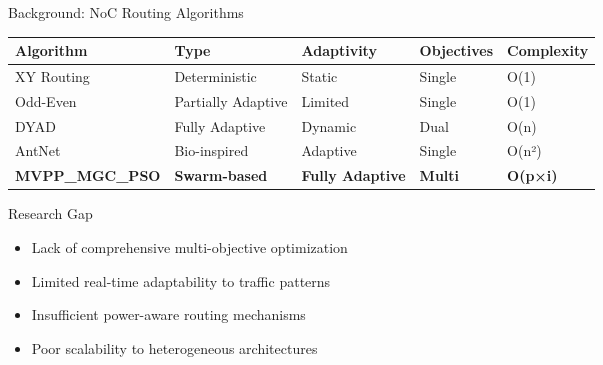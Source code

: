 \documentclass[10pt]{beamer}
\begin{document}
\begin{frame}{Background: NoC Routing Algorithms}
    \begin{table}
        \centering
        \small
        \begin{tabular}{@{}lllll@{}}
            \toprule
            \textbf{Algorithm} & \textbf{Type} & \textbf{Adaptivity} & \textbf{Objectives} & \textbf{Complexity} \\
            \midrule
            XY Routing & Deterministic & Static & Single & O(1) \\
            Odd-Even & Partially Adaptive & Limited & Single & O(1) \\
            DYAD & Fully Adaptive & Dynamic & Dual & O(n) \\
            AntNet & Bio-inspired & Adaptive & Single & O(n²) \\
            \textbf{MVPP\_MGC\_PSO} & \textbf{Swarm-based} & \textbf{Fully Adaptive} & \textbf{Multi} & \textbf{O(p×i)} \\
            \bottomrule
        \end{tabular}
    \end{table}
    
    \begin{block}{Research Gap}
        \begin{itemize}
            \item Lack of comprehensive multi-objective optimization
            \item Limited real-time adaptability to traffic patterns
            \item Insufficient power-aware routing mechanisms
            \item Poor scalability to heterogeneous architectures
        \end{itemize}
    \end{block}
\end{frame}
\end{document}
